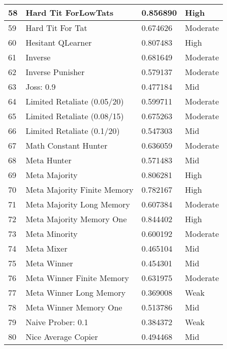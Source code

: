 \begin{longtable}{|p{0.5cm}||p{6cm}||p{4cm}||p{2cm}|}
			58  & Hard Tit ForLowTats         & 0.856890          & High     \\ \hline
			59  & Hard Tit For Tat            & 0.674626          & Moderate \\ \hline
			60  & Hesitant QLearner           & 0.807483          & High     \\ \hline
			61  & Inverse                     & 0.681649          & Moderate \\ \hline
			62  & Inverse Punisher            & 0.579137          & Moderate \\ \hline
			63  & Joss: 0.9                   & 0.477184          & Mid     \\ \hline
			64  & Limited Retaliate (0.05/20) & 0.599711          & Moderate \\ \hline
			65  & Limited Retaliate (0.08/15) & 0.675263          & Moderate \\ \hline
			66  & Limited Retaliate (0.1/20)  & 0.547303          & Mid     \\ \hline
			67  & Math Constant Hunter        & 0.636059          & Moderate \\ \hline
			68  & Meta Hunter                 & 0.571483          & Mid     \\ \hline
			69  & Meta Majority               & 0.806281          & High     \\ \hline
			70  & Meta Majority Finite Memory & 0.782167          & High     \\ \hline
			71  & Meta Majority Long Memory   & 0.607384          & Moderate \\ \hline
			72  & Meta Majority Memory One    & 0.844402          & High     \\ \hline
			73  & Meta Minority               & 0.600192          & Moderate \\ \hline
			74  & Meta Mixer                  & 0.465104          & Mid     \\ \hline
			75  & Meta Winner                 & 0.454301          & Mid     \\ \hline
			76  & Meta Winner Finite Memory   & 0.631975          & Moderate \\ \hline
			77  & Meta Winner Long Memory     & 0.369008          & Weak     \\ \hline
			78  & Meta Winner Memory One      & 0.513786          & Mid     \\ \hline
			79  & Naive Prober: 0.1           & 0.384372          & Weak     \\ \hline
			80  & Nice Average Copier         & 0.494468          & Mid     \\ \hline

\end{longtable}
